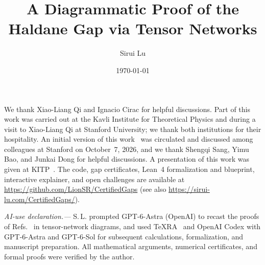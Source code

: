 \documentclass[aps,prl,reprint,amsmath,amssymb,nofootinbib]{revtex4-2}
\begin{document}
\title{A Diagrammatic Proof of the Haldane Gap via Tensor Networks}
\author{Sirui Lu}
\date{\today}

\begin{abstract}

\end{abstract}
\maketitle
\hideMainFromTOC



\begin{acknowledgments}
	We thank Xiao-Liang Qi and Ignacio Cirac for helpful discussions. Part of this work was
	carried out at the Kavli Institute for Theoretical Physics and during a visit to
	Xiao-Liang Qi at Stanford University; we thank both institutions for their hospitality.
	An initial version of this work~\cite{Lu2026Short} was circulated and discussed among
	colleagues at Stanford on October~7, 2026, and we thank Shengqi Sang, Yimu Bao, and
	Junkai Dong for helpful discussions. A presentation of this work was given at
	KITP~\cite{Lu2026Bridging}. The code, gap certificates, Lean~4 formalization and
	blueprint, interactive explainer, and open challenges are available at
	\url{https://github.com/LionSR/CertifiedGaps} (see also
	\url{https://sirui-lu.com/CertifiedGaps/}).
\end{acknowledgments}

\emph{AI-use declaration.---}%
S.\,L. prompted GPT-6-Astra (OpenAI) to recast the proofs of
Refs.~\cite{OpenAI2026Periodic,OpenAI2026Boundaryfield} in tensor-network diagrams, and
used TeXRA~\cite{TeXRA2025} and OpenAI Codex with GPT-6-Astra and GPT-6-Sol for subsequent
calculations, formalization, and manuscript preparation. All mathematical arguments,
numerical certificates, and formal proofs were verified by the author.

\par\label{main:text-end}



\end{document}
